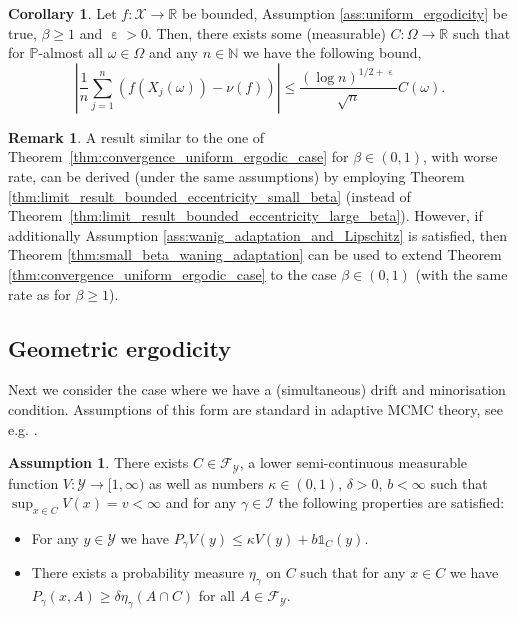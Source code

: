 \documentclass[12pt]{article}
\theoremstyle{definition}
\newtheorem{rem}[thm]{Remark}
\newtheorem{cor}[thm]{Corollary}
\newtheorem{ass}[thm]{Assumption}
\newcommand{\N}{\mathbb{N}}
\newcommand{\R}{\mathbb{R}}
\newcommand{\cX}{\mathcal{X}}
\newcommand{\cY}{\mathcal{Y}}
\DeclareMathOperator{\eps}{\varepsilon}
\begin{document}
\begin{cor}\label{cor:convergence_speed_uniform_ergodicity}
	Let $f \colon \cX \to \R$ be bounded, Assumption \ref{ass:uniform_ergodicity} be true, $\beta \geq1$ and $\eps >0$.
	Then, there exists some (measurable) $C \colon \Omega \to \R$ such that for $\mathbb{P}$-almost all $\omega \in \Omega$ and any $n \in \N$ we have the following bound,
	\[
	\left\vert  \frac{1}{{n}} \sum_{j=1}^n \left(  f(X_j(\omega)) - \nu(f)  \right)  \right\vert \leq \frac{(\log n)^{1/2+\eps}}{\sqrt{n}}C(\omega) .
	\]
\end{cor}


	\begin{rem}
		A result similar to the one of Theorem~\ref{thm:convergence_uniform_ergodic_case}
		for $\beta \in (0,1)$, with worse rate, can be derived (under the same assumptions) by employing Theorem \ref{thm:limit_result_bounded_eccentricity_small_beta} (instead of Theorem~\ref{thm:limit_result_bounded_eccentricity_large_beta}).  
		However, if additionally Assumption \ref{ass:wanig_adaptation_and_Lipschitz} is satisfied, then Theorem \ref{thm:small_beta_waning_adaptation} can be used to extend Theorem \ref{thm:convergence_uniform_ergodic_case} to the case $\beta\in(0,1)$ (with the same rate as for $\beta\geq 1$).
	\end{rem}





\subsection{Geometric ergodicity}\label{subsec:Geometric_Ergodicity}
Next we consider the case where we have a (simultaneous) drift and minorisation condition.
Assumptions of this form are standard in adaptive MCMC theory, see e.g. \cite{andrieu2006ergodicity,roberts2007coupling,fort2011convergence,saksman2010ergodicity,chimisov2018air}.

\begin{ass}\label{ass:drift_and_minorisation_new}
	There exists $C \in \mathcal{F}_\cY$, a lower semi-continuous measurable function $V \colon \cY \to [1,\infty)$ as well as numbers $\kappa \in (0,1)$, $\delta >0$, $b < \infty$ such that $\sup_{x\in C} V(x) = v< \infty$ and for any $\gamma \in \mathcal{I}$ the following properties are satisfied:
	\begin{itemize}
		\item[i)] For any $y \in \cY$ we have		$P_\gamma V(y) \leq \kappa V(y) + b\mathds{1}_C(y) $. 
		\item[ii)] 	There exists a probability measure $\eta_\gamma$ on $C$ such that for any ${x \in C}$ we have $P_\gamma (x, A )\geq \delta \eta_\gamma(A\cap C)$ for all $A\in\mathcal{F}_\cY$.
	\end{itemize}
\end{ass}
\end{document}
